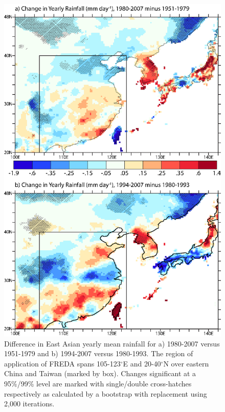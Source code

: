\documentclass[singlecolumn,11pt]{pnas-new}
\begin{document}
\begin{figure}
\centering
\noindent\includegraphics[width=32pc]{Figures/SFND}
\caption{Difference in East Asian yearly mean rainfall for a) 1980-2007 versus 1951-1979 and  b) 1994-2007 versus 1980-1993. The region of application of FREDA spans 105-123$^{\circ}$E and 20-40$^{\circ}$N over eastern China and Taiwan (marked by box). Changes significant at a 95\%/99\% level are marked with single/double cross-hatches respectively as calculated by a bootstrap with replacement using 2,000 iterations.}
\label{fig:sfnd}
\end{figure}

\clearpage
\end{document}
